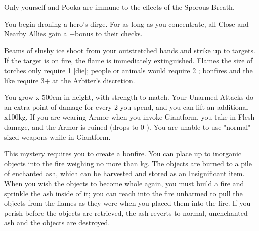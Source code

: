 {Only yourself and Pooka are immune to the effects of the Sporous Breath.

\newpage

\MYSTERY [
  Name = Dirge,
  Link = arcana-mystery-dirge,
  Paradigm = Death,
  Save = n/a,
  Duration = Concentration,
  Target = Close Target(s)
]

You begin droning a hero's dirge.  For as long as you concentrate, all Close and Nearby Allies gain a +\DICE bonus to their \DEATH checks.

\MYSTERY [
  Name = Extinguish,
  Link = arcana-mystery-extinguish,
  Paradigm = Elements,
  Save = N,
  Duration = Instant,
  Target = Close or Nearby Target(s)
]

Beams of slushy ice shoot from your outstretched hands and strike up to \DICE targets.  If the target is on fire, the flame is immediately extinguished.  Flames the size of torches only require 1 [die]; people or animals would require 2 \DICE; bonfires and the like require 3+ \DICE at the Arbiter's discretion.

\MYSTERY [
  Name = Giantform,
  Link = arcana-mystery-giantform,
  Paradigm = Biomancy,
  Save = n/a,
  Duration = Combat or \SUM Minutes,
  Target = Self
]

You grow \DICE x 500cm in height, with strength to match.  Your Unarmed Attacks do an extra point of damage for every 2 \DICE you spend, and you can lift an additional \DICE x100kg.   If you are wearing Armor when you invoke Giantform, you take \MAX \UD in Flesh damage, and the Armor is ruined (drops to 0 \MAX \UD).  You are unable to use "normal" sized weapons while in Giantform.

\MYSTERY [
  Name = Incinerate,
  Link = arcana-mystery-incinerate,
  Paradigm = Elements,
  Save = N,
  Duration = See Below,
  Target = Close Target(s)
]

This mystery requires you to create a bonfire.  You can place up to \DICE inorganic objects into the fire weighing no more than \SUMDICE kg.  The objects are burned to a pile of enchanted ash, which can be harvested and stored as an Insignificant item.  When you wish the objects to become whole again, you must build a fire and sprinkle the ash inside of it; you can reach into the fire unharmed to pull the objects from the flames as they were when you placed them into the fire.  If you perish before the objects are retrieved, the ash reverts to normal, unenchanted ash and the objects are destroyed.

}
